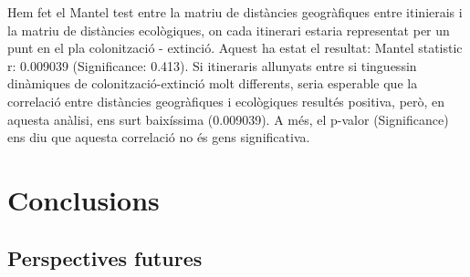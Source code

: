 \documentclass{article}
\begin{document}
Hem fet el Mantel test entre la matriu de dist\`ancies geogr\`afiques entre itinierais i la matriu de dist\`ancies ecol\`ogiques, on cada itinerari estaria representat per un punt en el pla colonitzaci\'o - extinci\'o. Aquest ha estat el resultat: Mantel statistic r: 0.009039 (Significance: 0.413). Si itineraris allunyats entre si tinguessin din\`amiques de colonitzaci\'o-extinci\'o molt differents, seria esperable que la correlaci\'o entre dist\`ancies geogr\`afiques i ecol\`ogiques result\'es positiva, per\`o, en aquesta an\`alisi, ens surt baix\'issima (0.009039). A m\'es, el p-valor (Significance) ens diu que aquesta correlaci\'o no \'es gens significativa.     

\newpage

\section{Conclusions}
\subsection{Perspectives futures}


\newpage
\printbibliography
\end{document}
